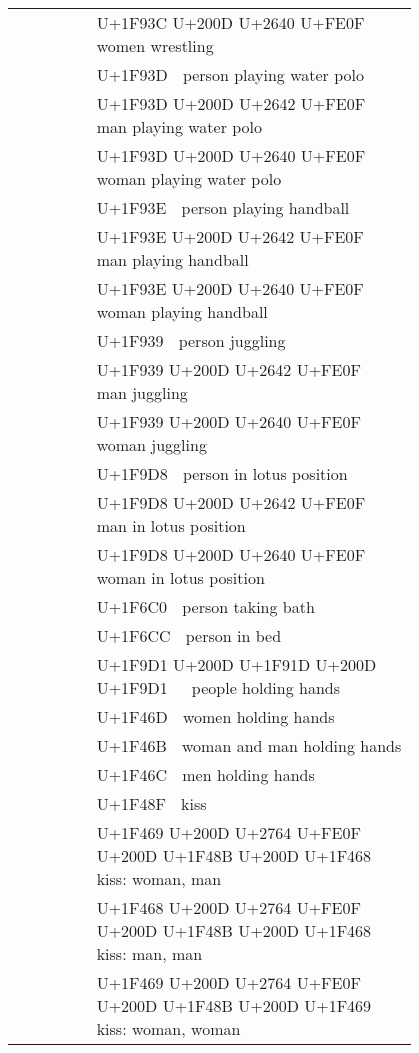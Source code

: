 \documentclass[a4paper,12pt]{article}
\newcommand{\fontA}[1]{{\fontspec[RawFeature={mode=harf,+dist,+ccmp}]{Segoe UI Emoji} #1}}
\newcommand{\fontB}[1]{{\fontspec[RawFeature={mode=harf,+dist,+ccmp}]{Noto Color Emoji} #1}}
\begin{document}
\begin{longtable}[c]{ccp{0.8\linewidth}}
\fontA{🤼‍♀️}&\fontB{🤼‍♀️}&U+1F93C U+200D U+2640 U+FE0F 🤼‍♀️ women wrestling\\
\fontA{🤽}&\fontB{🤽}&U+1F93D 🤽 person playing water polo\\
\fontA{🤽‍♂️}&\fontB{🤽‍♂️}&U+1F93D U+200D U+2642 U+FE0F 🤽‍♂️ man playing water polo\\
\fontA{🤽‍♀️}&\fontB{🤽‍♀️}&U+1F93D U+200D U+2640 U+FE0F 🤽‍♀️ woman playing water polo\\
\fontA{🤾}&\fontB{🤾}&U+1F93E 🤾 person playing handball\\
\fontA{🤾‍♂️}&\fontB{🤾‍♂️}&U+1F93E U+200D U+2642 U+FE0F 🤾‍♂️ man playing handball\\
\fontA{🤾‍♀️}&\fontB{🤾‍♀️}&U+1F93E U+200D U+2640 U+FE0F 🤾‍♀️ woman playing handball\\
\fontA{🤹}&\fontB{🤹}&U+1F939 🤹 person juggling\\
\fontA{🤹‍♂️}&\fontB{🤹‍♂️}&U+1F939 U+200D U+2642 U+FE0F 🤹‍♂️ man juggling\\
\fontA{🤹‍♀️}&\fontB{🤹‍♀️}&U+1F939 U+200D U+2640 U+FE0F 🤹‍♀️ woman juggling\\
\fontA{🧘}&\fontB{🧘}&U+1F9D8 🧘 person in lotus position\\
\fontA{🧘‍♂️}&\fontB{🧘‍♂️}&U+1F9D8 U+200D U+2642 U+FE0F 🧘‍♂️ man in lotus position\\
\fontA{🧘‍♀️}&\fontB{🧘‍♀️}&U+1F9D8 U+200D U+2640 U+FE0F 🧘‍♀️ woman in lotus position\\
\fontA{🛀}&\fontB{🛀}&U+1F6C0 🛀 person taking bath\\
\fontA{🛌}&\fontB{🛌}&U+1F6CC 🛌 person in bed\\
\fontA{🧑‍🤝‍🧑}&\fontB{🧑‍🤝‍🧑}&U+1F9D1 U+200D U+1F91D U+200D U+1F9D1 🧑‍🤝‍🧑 people holding hands\\
\fontA{👭}&\fontB{👭}&U+1F46D 👭 women holding hands\\
\fontA{👫}&\fontB{👫}&U+1F46B 👫 woman and man holding hands\\
\fontA{👬}&\fontB{👬}&U+1F46C 👬 men holding hands\\
\fontA{💏}&\fontB{💏}&U+1F48F 💏 kiss\\
\fontA{👩‍❤️‍💋‍👨}&\fontB{👩‍❤️‍💋‍👨}&U+1F469 U+200D U+2764 U+FE0F U+200D U+1F48B U+200D U+1F468 👩‍❤️‍💋‍👨 kiss: woman, man\\
\fontA{👨‍❤️‍💋‍👨}&\fontB{👨‍❤️‍💋‍👨}&U+1F468 U+200D U+2764 U+FE0F U+200D U+1F48B U+200D U+1F468 👨‍❤️‍💋‍👨 kiss: man, man\\
\fontA{👩‍❤️‍💋‍👩}&\fontB{👩‍❤️‍💋‍👩}&U+1F469 U+200D U+2764 U+FE0F U+200D U+1F48B U+200D U+1F469 👩‍❤️‍💋‍👩 kiss: woman, woman\\

\end{longtable}
\end{document}
